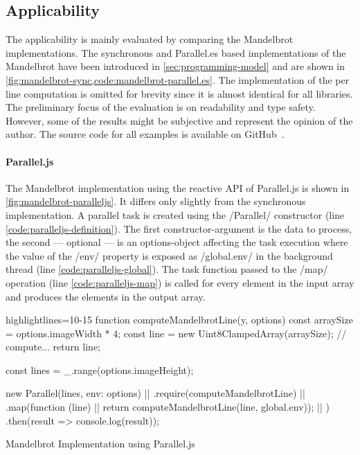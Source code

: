 \subsection{Applicability}
The applicability is mainly evaluated by comparing the Mandelbrot implementations. The synchronous and Parallel.es based implementations of the Mandelbrot have been introduced in \cref{sec:programming-model} and are shown in \cref{fig:mandelbrot-sync,code:mandelbrot-parallel.es}. The implementation of the per line computation is omitted for brevity since it is almost identical for all libraries. The preliminary focus of the evaluation is on readability and type safety. However, some of the results might be subjective and represent the opinion of the author. The source code for all examples is available on GitHub~\cite{Reiser2016}. 

\paragraph{Parallel.js}
The Mandelbrot implementation using the reactive API of Parallel.js is shown in \cref{fig:mandelbrot-paralleljs}. It differs only slightly from the synchronous implementation. A parallel task is created using the \javascriptinline/Parallel/ constructor (line \ref{code:paralleljs-definition}). The first constructor-argument is the data to process, the second --- optional ---  is an options-object affecting the task execution where the value of the \javascriptinline/env/ property is exposed as \javascriptinline/global.env/ in the background thread (line \ref{code:paralleljs-global}). The task function passed to the \javascriptinline/map/ operation (line \ref{code:paralleljs-map}) is called for every element in the input array and produces the elements in the output array.

\begin{listing}
	\begin{javascriptcode*}{highlightlines={10-15}}
function computeMandelbrotLine(y, options) {
	const arraySize = options.imageWidth * 4;
	const line = new Uint8ClampedArray(arraySize);
	// compute...
	return line;
}

const lines = _.range(options.imageHeight);

new Parallel(lines, {env: options}) |$\label{code:paralleljs-definition}$|
	.require(computeMandelbrotLine)  |$\label{code:paralleljs-require}$|
	.map(function (line) { |$\label{code:paralleljs-map}$|
		return computeMandelbrotLine(line, global.env)); |$\label{code:paralleljs-global}$|
	})
	.then(result => console.log(result));
\end{javascriptcode*}

\caption{Mandelbrot Implementation using Parallel.js}
\label{fig:mandelbrot-paralleljs}
\end{listing}


